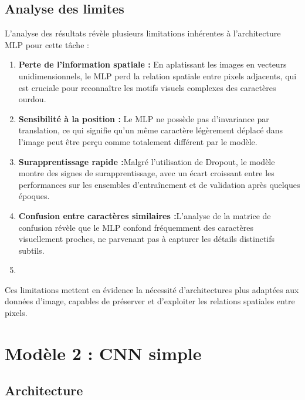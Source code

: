 \subsection{Analyse des limites}
\begin{flushleft}
L'analyse des résultats révèle plusieurs limitations inhérentes à l'architecture MLP pour cette tâche :

\begin{enumerate}
\item \textbf{Perte de l'information spatiale :} En aplatissant les images en vecteurs unidimensionnels, le MLP perd la relation spatiale entre pixels adjacents, qui est cruciale pour reconnaître les motifs visuels complexes des caractères ourdou.
\item \textbf{Sensibilité à la position : }Le MLP ne possède pas d'invariance par translation, ce qui signifie qu'un même caractère légèrement déplacé dans l'image peut être perçu comme totalement différent par le modèle. 
\item \textbf{Surapprentissage rapide :}Malgré l'utilisation de Dropout, le modèle montre des signes de surapprentissage, avec un écart croissant entre les performances sur les ensembles d'entraînement et de validation après quelques époques.
\item \textbf{Confusion entre caractères similaires :}L'analyse de la matrice de confusion révèle que le MLP confond fréquemment des caractères visuellement proches, ne parvenant pas à capturer les détails distinctifs subtils.
\item \textbf{}
\end{enumerate}

Ces limitations mettent en évidence la nécessité d'architectures plus adaptées aux données d'image, capables de préserver et d'exploiter les relations spatiales entre pixels.
\end{flushleft}

\section{Modèle 2 : CNN simple}

\subsection{Architecture}

